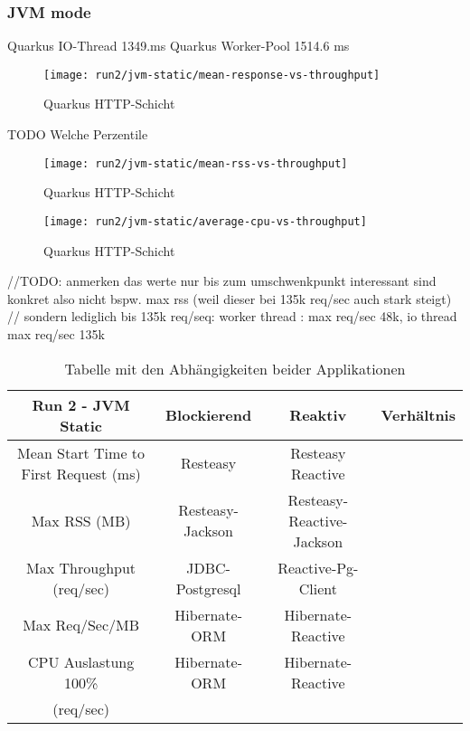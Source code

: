 \subsubsection{JVM mode}
Quarkus IO-Thread 1349.ms
Quarkus Worker-Pool 1514.6 ms

\begin{figure}[h]
    \centering
    \texttt{[image: run2/jvm-static/mean-response-vs-throughput]}
    \caption{Quarkus HTTP-Schicht \parencite{QuarkusReactiveRoutes}}
    \label{fig:static_mean_response}
\end{figure}

TODO Welche Perzentile
\begin{figure}[h]
    \centering
    \texttt{[image: run2/jvm-static/mean-rss-vs-throughput]}
    \caption{Quarkus HTTP-Schicht \parencite{QuarkusReactiveRoutes}}
    \label{fig:static_mean_rss}
\end{figure}


\begin{figure}[h]
    \centering
    \texttt{[image: run2/jvm-static/average-cpu-vs-throughput]}
    \caption{Quarkus HTTP-Schicht \parencite{QuarkusReactiveRoutes}}
    \label{fig:static_avg_cpu}
\end{figure}

//TODO: anmerken das werte nur bis zum umschwenkpunkt interessant sind konkret also nicht bspw. max rss (weil dieser bei 135k req/sec auch stark steigt)
// sondern lediglich bis 135k req/seq: worker thread : max req/sec 48k, io thread max req/sec 135k
\begin{table}[ht!]
    \centering
    \begin{tabular}{| c | c | c | c |}
        \hline
        Run 2 - JVM Static                    & Blockierend      & Reaktiv                   & Verhältnis \\
        \hline
        Mean Start Time to First Request (ms) & Resteasy         & Resteasy Reactive         &            \\
        \hline
        Max RSS (MB)                          & Resteasy-Jackson & Resteasy-Reactive-Jackson &            \\
        \hline
        Max Throughput (req/sec)              & JDBC-Postgresql  & Reactive-Pg-Client        &            \\
        \hline
        Max Req/Sec/MB                        & Hibernate-ORM    & Hibernate-Reactive        &            \\
        \hline
        CPU Auslastung 100\%                  & Hibernate-ORM    & Hibernate-Reactive        &            \\
        (req/sec)
    \end{tabular}
    \caption{Tabelle mit den Abhängigkeiten beider Applikationen}
    \label{table:static_measurement_results}
\end{table}

